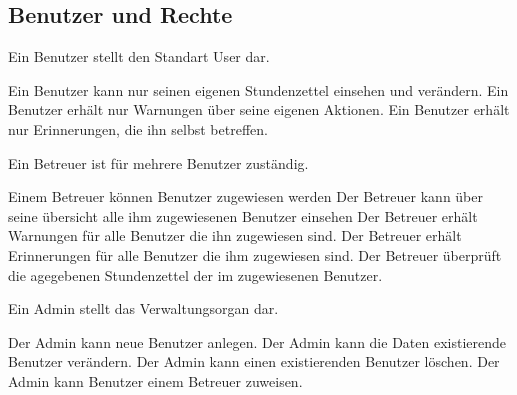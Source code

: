 \subsection{Benutzer und Rechte}

\begin{requirements}
    Ein Benutzer stellt den Standart User dar.
    \begin{requirements}
         Ein Benutzer kann nur seinen eigenen Stundenzettel einsehen und verändern.
         Ein Benutzer erhält nur Warnungen über seine eigenen Aktionen.
         Ein Benutzer erhält nur Erinnerungen, die ihn selbst betreffen.
    \end{requirements}

        Ein Betreuer ist für mehrere Benutzer zuständig.
        \begin{requirements}
             Einem Betreuer können Benutzer zugewiesen werden
             Der Betreuer kann über seine übersicht alle ihm zugewiesenen Benutzer einsehen
             Der Betreuer erhält Warnungen für alle Benutzer die ihn zugewiesen sind.
             Der Betreuer erhält Erinnerungen für alle Benutzer die ihm zugewiesen sind.
             Der Betreuer überprüft die agegebenen Stundenzettel der im zugewiesenen Benutzer.
        \end{requirements}

        Ein Admin stellt das Verwaltungsorgan dar.
        \begin{requirements}
             Der Admin kann neue Benutzer anlegen.
             Der Admin kann die Daten existierende Benutzer verändern.
             Der Admin kann einen existierenden Benutzer löschen.
             Der Admin kann Benutzer einem Betreuer zuweisen.
        \end{requirements}
\end{requirements}


